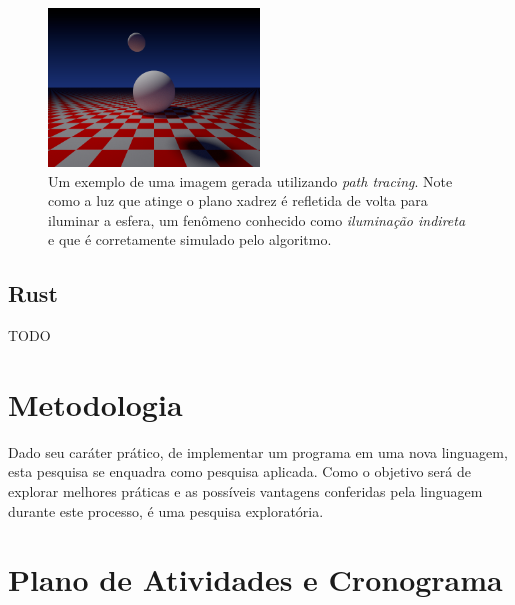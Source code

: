 \documentclass[12pt]{article}
\newcommand{\todo}[1]{\textsf{\color{red}#1}}
\begin{document}
\begin{figure}
	\centering
	\includegraphics[width=0.5\textwidth]{exemplo_imagem}
	\caption{
		Um exemplo de uma imagem gerada utilizando \emph{path tracing}. Note como a luz que atinge o
		plano xadrez é refletida de volta para iluminar a esfera, um fenômeno conhecido como
		\emph{iluminação indireta} e que é corretamente simulado pelo algoritmo.
	}
	\label{fig:path_tracing}
\end{figure}

\subsection{Rust}

\todo{TODO}

\section{Metodologia}

Dado seu caráter prático, de implementar um programa em uma nova linguagem, esta pesquisa se
enquadra como pesquisa aplicada. Como o objetivo será de explorar melhores práticas e as possíveis
vantagens conferidas pela linguagem durante este processo, é uma pesquisa exploratória.

\section{Plano de Atividades e Cronograma}
\end{document}

